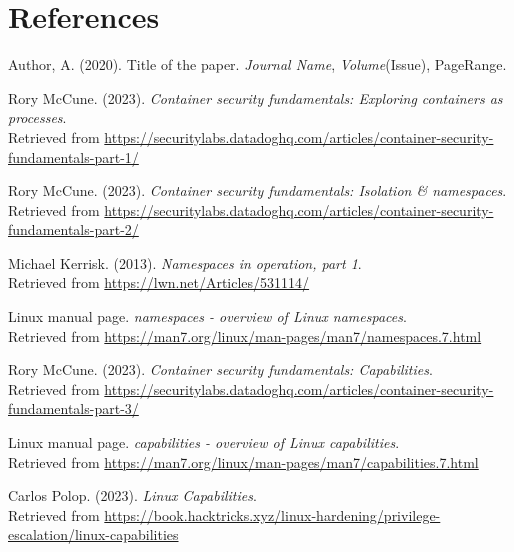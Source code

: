 \documentclass{article}
\begin{document}
\newpage
{}
\section{References}
\begin{thebibliography}{99} %

  Author, A. (2020). Title of the paper. \emph{Journal Name}, \emph{Volume}(Issue), PageRange.

  Rory McCune. (2023). \emph{Container security fundamentals: Exploring containers as processes}.\\
  Retrieved from \url{https://securitylabs.datadoghq.com/articles/container-security-fundamentals-part-1/}

  Rory McCune. (2023). \emph{Container security fundamentals: Isolation \& namespaces}.\\
  Retrieved from \url{https://securitylabs.datadoghq.com/articles/container-security-fundamentals-part-2/}

  Michael Kerrisk. (2013). \emph{Namespaces in operation, part 1}.\\
  Retrieved from \url{https://lwn.net/Articles/531114/}

  Linux manual page. \emph{namespaces - overview of Linux namespaces}.\\
  Retrieved from \url{https://man7.org/linux/man-pages/man7/namespaces.7.html}

  Rory McCune. (2023). \emph{Container security fundamentals: Capabilities}.\\
  Retrieved from \url{https://securitylabs.datadoghq.com/articles/container-security-fundamentals-part-3/}

  Linux manual page. \emph{capabilities - overview of Linux capabilities}.\\
  Retrieved from \url{https://man7.org/linux/man-pages/man7/capabilities.7.html}

  Carlos Polop. (2023). \emph{Linux Capabilities}.\\
  Retrieved from \url{https://book.hacktricks.xyz/linux-hardening/privilege-escalation/linux-capabilities}


\end{thebibliography}
\end{document}
